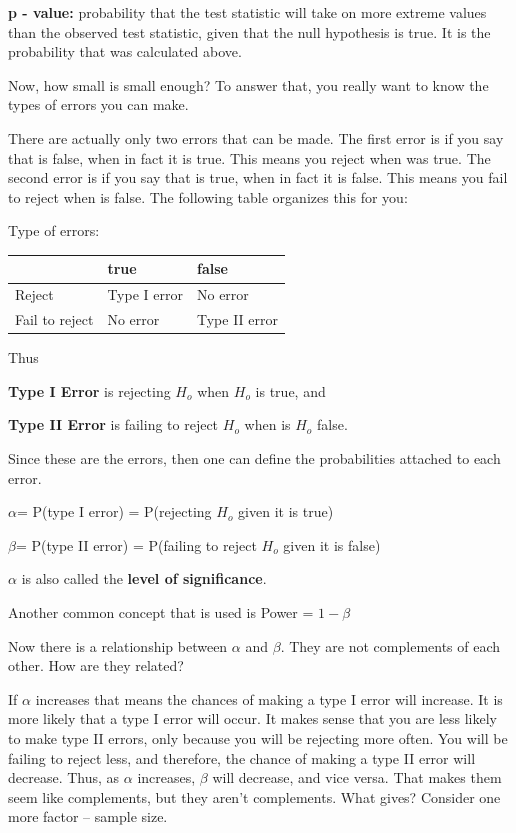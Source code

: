 \documentclass[
]{book}
\begin{document}
\textbf{p - value:} probability that the test statistic will take on more extreme values than the observed test statistic, given that the null hypothesis is true. It is the probability that was calculated above.

Now, how small is small enough? To answer that, you really want to know the types of errors you can make.

There are actually only two errors that can be made. The first error is if you say that is false, when in fact it is true. This means you reject when was true. The second error is if you say that is true, when in fact it is false. This means you fail to reject when is false. The following table organizes this for you:

Type of errors:

\begin{longtable}[]{@{}lll@{}}
\toprule
& true & false\tabularnewline
\midrule
\endhead
Reject & Type I error & No error\tabularnewline
Fail to reject & No error & Type II error\tabularnewline
\bottomrule
\end{longtable}

Thus

\textbf{Type I Error} is rejecting \(H_o\) when \(H_o\) is true, and

\textbf{Type II Error} is failing to reject \(H_o\) when is \(H_o\) false.

Since these are the errors, then one can define the probabilities attached to each error.

\(\alpha\)= P(type I error) = P(rejecting \(H_o\) given it is true)

\(\beta\)= P(type II error) = P(failing to reject \(H_o\) given it is false)

\(\alpha\) is also called the \textbf{level of significance}.

Another common concept that is used is Power = \(1-\beta\)

Now there is a relationship between \(\alpha\) and \(\beta\). They are not complements of each other. How are they related?

If \(\alpha\) increases that means the chances of making a type I error will increase. It is more likely that a type I error will occur. It makes sense that you are less likely to make type II errors, only because you will be rejecting more often. You will be failing to reject less, and therefore, the chance of making a type II error will decrease. Thus, as \(\alpha\) increases, \(\beta\) will decrease, and vice versa. That makes them seem like complements, but they aren't complements. What gives? Consider one more factor -- sample size.
\end{document}
